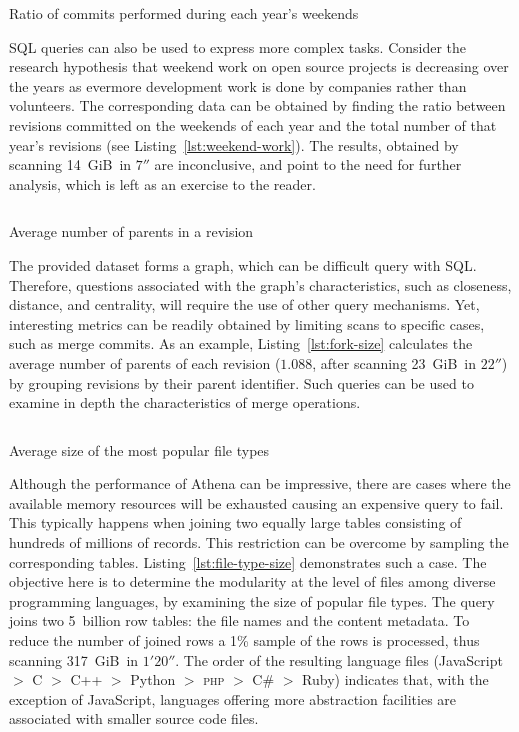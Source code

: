 \begin{listing}[H]
    \inputminted[firstline=3]{sql}{codesamples/graph-dataset/weekend-work.sql}
    \caption{Ratio of commits performed during each year's weekends}%
    \label{lst:weekend-work}
\end{listing}

SQL queries can also be used to express more complex tasks.
Consider the research hypothesis that weekend work on open source projects
is decreasing over the years as evermore
development work is done by companies rather than volunteers.
The corresponding data can be obtained by finding the ratio
between revisions committed on the weekends of each year and
the total number of that year's revisions (see Listing~\ref{lst:weekend-work}).
The results, obtained by scanning 14~GiB\ in $7''$ are inconclusive,
and point to the need for further analysis,
which is left as an exercise to the reader.

\begin{listing}[H]
    \inputminted[firstline=4]{sql}{codesamples/graph-dataset/fork-size.sql}
    \caption{Average number of parents in a revision}%
    \label{lst:fork-size}
\end{listing}

The provided dataset forms a graph, which can be difficult query with SQL.
Therefore, questions associated with the graph's characteristics,
such as closeness, distance, and centrality, will require the use of
other query mechanisms.
Yet, interesting metrics can be readily obtained by limiting scans
to specific cases, such as merge commits.
As an example, Listing~\ref{lst:fork-size} calculates the average
number of parents of each revision ($1.088$, after scanning 23~GiB\ in $22''$)
by grouping revisions by their parent identifier.
Such queries can be used to examine in depth the characteristics
of merge operations.

\begin{listing}[H]
    \inputminted[firstline=4]{sql}{codesamples/graph-dataset/file-type-size.sql}
    \caption{Average size of the most popular file types}%
    \label{lst:file-type-size}
\end{listing}

Although the performance of Athena can be impressive, there are cases where the
available memory resources will be exhausted causing an expensive query to
fail.
This typically happens when joining two equally large tables consisting of
hundreds of millions of records.
This restriction can be overcome by sampling the corresponding tables.
Listing~\ref{lst:file-type-size} demonstrates such a case.
The objective here is to determine the modularity at the level of files among
diverse programming languages, by examining the size of popular file types.
The query joins two 5~billion row tables:
the file names and the content metadata.
To reduce the number of joined rows a 1\% sample of the rows is processed,
thus scanning 317~GiB\ in $1'20''$.
The order of the resulting language files
(JavaScript $>$ C $>$ C++ $>$ Python $>$ \textsc{php} $>$ C\# $>$ Ruby)
indicates that, with the exception of JavaScript, languages offering more
abstraction facilities are associated with smaller source code files.

